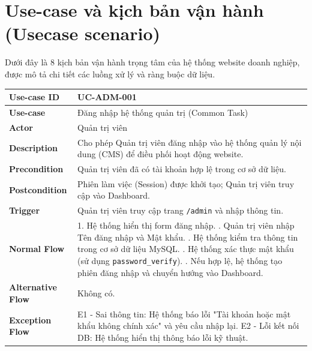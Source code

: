 \section{Use-case và kịch bản vận hành (Usecase scenario)}

Dưới đây là 8 kịch bản vận hành trọng tâm của hệ thống website doanh nghiệp, được mô tả chi tiết các luồng xử lý và ràng buộc dữ liệu.

\begin{table}[H]
\centering
\renewcommand{\arraystretch}{1.2}
\begin{tabular}{|p{3.5cm}|p{9.5cm}|}
\hline
\textbf{Use-case ID} & UC-ADM-001 \\ \hline
\textbf{Use-case} & Đăng nhập hệ thống quản trị (Common Task) \\ \hline
\textbf{Actor} & Quản trị viên \\ \hline
\textbf{Description} & Cho phép Quản trị viên đăng nhập vào hệ thống quản lý nội dung (CMS) để điều phối hoạt động website. \\ \hline
\textbf{Precondition} & Quản trị viên đã có tài khoản hợp lệ trong cơ sở dữ liệu. \\ \hline
\textbf{Postcondition} & Phiên làm việc (Session) được khởi tạo; Quản trị viên truy cập vào Dashboard. \\ \hline
\textbf{Trigger} & Quản trị viên truy cập trang \texttt{/admin} và nhập thông tin. \\ \hline
\textbf{Normal Flow} & 
1. Hệ thống hiển thị form đăng nhập. \newline
2. Quản trị viên nhập Tên đăng nhập và Mật khẩu. \newline
3. Hệ thống kiểm tra thông tin trong cơ sở dữ liệu MySQL. \newline
4. Hệ thống xác thực mật khẩu (sử dụng \texttt{password\_verify}). \newline
5. Nếu hợp lệ, hệ thống tạo phiên đăng nhập và chuyển hướng vào Dashboard. \\ \hline
\textbf{Alternative Flow} & Không có. \\ \hline
\textbf{Exception Flow} & 
E1 - Sai thông tin: Hệ thống báo lỗi "Tài khoản hoặc mật khẩu không chính xác" và yêu cầu nhập lại. \newline
E2 - Lỗi kết nối DB: Hệ thống hiển thị thông báo lỗi kỹ thuật. \\ \hline
\end{tabular}
\end{table}


